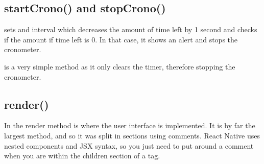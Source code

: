 \subsection{startCrono() and stopCrono()}

\lstset{style=myhtml}


 sets and interval which decreases the amount of time left by 1 second and checks if the amount if time left is 0. In that case, it shows an alert and stops the cronometer.

 is a very simple method as it only clears the timer, therefore stopping the cronometer.

\subsection{render()}
\label{subsec:render}

\lstset{style=myhtml}


In the render method is where the user interface is implemented. It is by far the largest method, and so it was split in sections using comments. React Native uses nested components and JSX syntax, so you just need to put \code{\{ \}} around a comment when you are within the children section of a tag.

